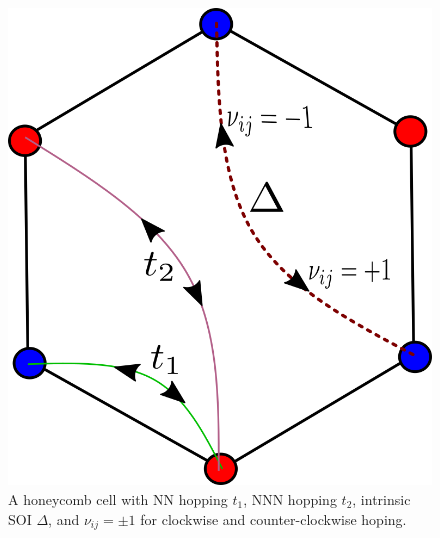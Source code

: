 \documentclass[aps,prl,twocolumn,amsmath,amssymb,nobibnotes]{revtex4-1}%
\begin{document}
\begin{figure}[t]
\centering
\includegraphics[width=0.6\columnwidth]{kmh.png}
\caption{A honeycomb cell with NN hopping $t_1$, NNN hopping $t_2$, intrinsic SOI $\Delta$, and $\nu_{ij} = \pm 1$ for clockwise and counter-clockwise hoping.}
\label{fig1}
\vspace*{-6pt}
\end{figure}
\end{document}
